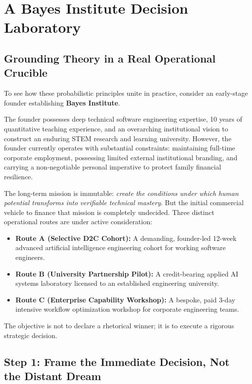 \section{A Bayes Institute Decision Laboratory}

\subsection{Grounding Theory in a Real Operational Crucible}

To see how these probabilistic principles unite in practice, consider an early-stage founder establishing \textbf{Bayes Institute}.

The founder possesses deep technical software engineering expertise, 10 years of quantitative teaching experience, and an overarching institutional vision to construct an enduring STEM research and learning university. However, the founder currently operates with substantial constraints: maintaining full-time corporate employment, possessing limited external institutional branding, and carrying a non-negotiable personal imperative to protect family financial resilience.

The long-term mission is immutable: \textit{create the conditions under which human potential transforms into verifiable technical mastery}. But the initial commercial vehicle to finance that mission is completely undecided. Three distinct operational routes are under active consideration:

\begin{itemize}[leftmargin=10pt,itemsep=1pt,topsep=1pt]
  \item \textbf{Route A (Selective D2C Cohort):} A demanding, founder-led 12-week advanced artificial intelligence engineering cohort for working software engineers.
  \item \textbf{Route B (University Partnership Pilot):} A credit-bearing applied AI systems laboratory licensed to an established engineering university.
  \item \textbf{Route C (Enterprise Capability Workshop):} A bespoke, paid 3-day intensive workflow optimization workshop for corporate engineering teams.
\end{itemize}

The objective is not to declare a rhetorical winner; it is to execute a rigorous strategic decision.

\subsection{Step 1: Frame the Immediate Decision, Not the Distant Dream}


